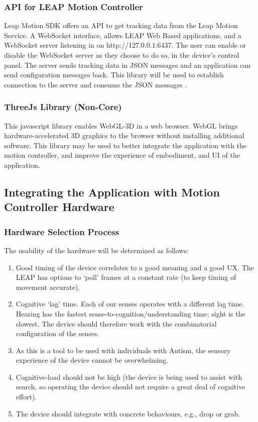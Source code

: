 \documentclass[10pt]{article}
\begin{document}
\subsubsection{API for LEAP Motion Controller}
Leap Motion SDK offers an API to get tracking data from the Leap Motion Service. A WebSocket interface, allows LEAP Web Based applications, and a WebSocket server listening in on http://127.0.0.1:6437. The user can enable or disable the WebSocket server as they choose to do so, in the device's control panel.
The server sends tracking data in JSON messages and an application can send configuration messages back. This library will be used to establish connection to the server and consume the JSON messages \cite{leap}. 


\subsubsection{ThreeJs Library (Non-Core)}
This javascript library enables WebGL-3D in a web browser. WebGL brings hardware-accelerated 3D graphics to the browser without installing additional software. This library may be used to better integrate the application with the motion controller, and improve the experience of embodiment, and UI of the application.


\subsection{Integrating the Application with Motion Controller Hardware }\label{hardware}
\subsubsection{Hardware Selection Process}
The usability of the hardware will be determined as follows: 
\begin{enumerate}
\item Good timing of the device correlates to a good meaning and a good UX. The LEAP has options to ‘poll’ frames at a constant rate (to keep timing of movement accurate).
\item Cognitive ‘lag’ time. Each of our senses operates with a different lag time. Hearing has the fastest sense-to-cognition/understanding time; sight is the slowest. The device should therefore work with the combinatorial configuration of the senses.
\item As this is a tool to be used with individuals with Autism, the sensory experience of the device cannot be overwhelming.
\item Cognitive-load should not be high (the device is being used to assist with search, so operating the device should not require a great deal of cognitive effort).
\item The device should integrate with concrete behaviours, e.g., drop or grab. 

\end{enumerate}
\end{document}
